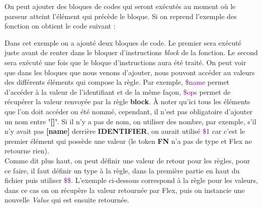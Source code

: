 \documentclass[a4paper]{article}%
\begin{document}
On peut ajouter des bloques de codes qui seront exécutés au moment où le parseur
atteint l'élément qui précède le bloque. Si on reprend l'exemple des fonction on
obtient le code suivant :

\leavevmode\newline

Dans cet exemple on a ajouté deux bloques de code. Le premier sera exécuté juste
avant de renter dans le bloquer d'instructions \textit{block} de la fonction. Le
second sera exécuté une fois que le bloque d'instructions aura été traité. On
peut voir que dans les bloques que nous venons d'ajouter, nous pouvont accéder
au valeurs des différents éléments qui compose la règle. Par exemple,
\textcolor{purple}{\$name} permet d'accéder à la valeur de l'identifiant et de la
même façon, \textcolor{purple}{\$ops} permet de récupérer la valeur renvoyée par
la règle \textbf{block}. À noter qu'ici tous les éléments que l'on doit accéder
on été nommé, cependant, il n'est pas obligatoire d'ajouter un nom entre
\textbf{'[]'}. Si il n'y a pas de nom, on utiliser des nombre, par exemple, s'il
n'y avait pas \textbf{[name]} derrière \textbf{IDENTIFIER}, on aurait utilisé
\textcolor{purple}{\$1} car c'est le premier élément qui possède une valeur (le
token \textbf{FN} n'a pas de type et Flex ne retourne rien).\\


Comme dit plus haut, on peut définir une valeur de retour pour les règles, pour
ce faire, il faut définir un type à la règle, dans la première partie en haut du
fichier puis utiliser \textcolor{purple}{\$\$}. L'exemple ci-dessous correspond
à la règle pour les valeurs, dans ce cas on on récupère la valeur retournée par
Flex, puis on instancie une nouvelle \textit{Value} qui est ensuite retournée.

\leavevmode\newline
\end{document}

